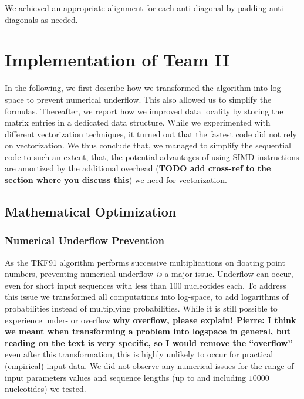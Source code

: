\documentclass[runningheads,a4paper]{llncs}
\begin{document}
We achieved an appropriate alignment for each anti-diagonal by padding anti-diagonals as needed. 


\section{Implementation of Team II}

In the following, we first describe how we transformed the algorithm into log-space to prevent numerical underflow. 
This also allowed us to simplify the formulas. 
Thereafter, we report how we improved data locality by storing the matrix entries in a dedicated data structure. 
While we experimented with different vectorization techniques, it turned out that the fastest code did not rely on vectorization. 
We thus conclude that, we managed to simplify the sequential code to such an extent, that, the potential advantages of using SIMD instructions 
are amortized by the additional overhead ({\bf TODO add cross-ref to the section where you discuss this}) we need for vectorization.

\subsection{Mathematical Optimization}

\subsubsection{Numerical Underflow Prevention}
\label{sec:log}

As the TKF91 algorithm performs successive multiplications on floating point numbers, preventing numerical underflow
{\em is} a major issue. Underflow can occur, even for short input sequences with less than $100$ nucleotides each.
To address this issue we transformed all computations into log-space, to add logarithms of probabilities instead of multiplying probabilities.
While it is still possible to experience under- or overflow {\bf why overflow, please explain! Pierre: I think we meant when transforming a problem into logspace in general, but reading on the text is very specific, so I would remove the ``overflow''} even after this transformation, 
this is highly unlikely to occur for practical (empirical) input data.
We did not observe any numerical issues for the range of input parameters values and sequence lengths (up to and including $10000$ nucleotides) 
we tested.
\end{document}
